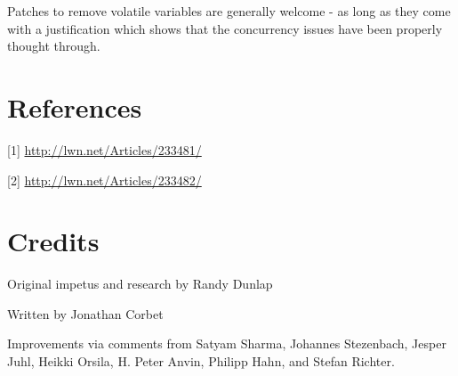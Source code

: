\documentclass[a4paper,8pt,english]{sphinxmanual}
\begin{document}
Patches to remove volatile variables are generally welcome - as long as
they come with a justification which shows that the concurrency issues have
been properly thought through.


\section{References}
\label{process/volatile-considered-harmful:references}
{[}1{]} \href{http://lwn.net/Articles/233481/}{http://lwn.net/Articles/233481/}

{[}2{]} \href{http://lwn.net/Articles/233482/}{http://lwn.net/Articles/233482/}


\section{Credits}
\label{process/volatile-considered-harmful:credits}
Original impetus and research by Randy Dunlap

Written by Jonathan Corbet

Improvements via comments from Satyam Sharma, Johannes Stezenbach, Jesper
Juhl, Heikki Orsila, H. Peter Anvin, Philipp Hahn, and Stefan
Richter.



\renewcommand{\indexname}{Index}
\printindex
\end{document}
